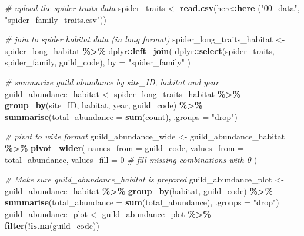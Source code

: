 \documentclass[
]{article}
\newenvironment{Shaded}{\begin{snugshade}}{\end{snugshade}}
\newcommand{\AttributeTok}[1]{\textcolor[rgb]{0.13,0.29,0.53}{#1}}
\newcommand{\CommentTok}[1]{\textcolor[rgb]{0.56,0.35,0.01}{\textit{#1}}}
\newcommand{\DecValTok}[1]{\textcolor[rgb]{0.00,0.00,0.81}{#1}}
\newcommand{\FunctionTok}[1]{\textcolor[rgb]{0.13,0.29,0.53}{\textbf{#1}}}
\newcommand{\NormalTok}[1]{#1}
\newcommand{\OtherTok}[1]{\textcolor[rgb]{0.56,0.35,0.01}{#1}}
\newcommand{\SpecialCharTok}[1]{\textcolor[rgb]{0.81,0.36,0.00}{\textbf{#1}}}
\newcommand{\StringTok}[1]{\textcolor[rgb]{0.31,0.60,0.02}{#1}}
\begin{document}
\begin{Shaded}
\begin{Highlighting}[]
\CommentTok{\# upload the spider traits data}
\NormalTok{spider\_traits }\OtherTok{\textless{}{-}} \FunctionTok{read.csv}\NormalTok{(here}\SpecialCharTok{::}\FunctionTok{here}\NormalTok{ (}\StringTok{"00\_data"}\NormalTok{, }\StringTok{"spider\_family\_traits.csv"}\NormalTok{))}

\CommentTok{\# join to spider habitat data (in long format)}
\NormalTok{spider\_long\_traits\_habitat }\OtherTok{\textless{}{-}}\NormalTok{ spider\_long\_habitat }\SpecialCharTok{\%\textgreater{}\%}
\NormalTok{  dplyr}\SpecialCharTok{::}\FunctionTok{left\_join}\NormalTok{(}
\NormalTok{    dplyr}\SpecialCharTok{::}\FunctionTok{select}\NormalTok{(spider\_traits, spider\_family, guild\_code),}
    \AttributeTok{by =} \StringTok{"spider\_family"}
\NormalTok{  )}

\CommentTok{\# summarize guild abundance by site\_ID, habitat and year}
\NormalTok{guild\_abundance\_habitat }\OtherTok{\textless{}{-}}\NormalTok{ spider\_long\_traits\_habitat }\SpecialCharTok{\%\textgreater{}\%}
  \FunctionTok{group\_by}\NormalTok{(site\_ID, habitat, year, guild\_code) }\SpecialCharTok{\%\textgreater{}\%}
  \FunctionTok{summarise}\NormalTok{(}\AttributeTok{total\_abundance =} \FunctionTok{sum}\NormalTok{(count), }\AttributeTok{.groups =} \StringTok{"drop"}\NormalTok{)}

\CommentTok{\# pivot to wide format}
\NormalTok{guild\_abundance\_wide }\OtherTok{\textless{}{-}}\NormalTok{ guild\_abundance\_habitat }\SpecialCharTok{\%\textgreater{}\%}
  \FunctionTok{pivot\_wider}\NormalTok{(}
    \AttributeTok{names\_from =}\NormalTok{ guild\_code,}
    \AttributeTok{values\_from =}\NormalTok{ total\_abundance,}
    \AttributeTok{values\_fill =} \DecValTok{0}  \CommentTok{\# fill missing combinations with 0}
\NormalTok{  )}

\CommentTok{\# Make sure guild\_abundance\_habitat is prepared}
\NormalTok{guild\_abundance\_plot }\OtherTok{\textless{}{-}}\NormalTok{ guild\_abundance\_habitat }\SpecialCharTok{\%\textgreater{}\%}
  \FunctionTok{group\_by}\NormalTok{(habitat, guild\_code) }\SpecialCharTok{\%\textgreater{}\%}
  \FunctionTok{summarise}\NormalTok{(}\AttributeTok{total\_abundance =} \FunctionTok{sum}\NormalTok{(total\_abundance), }\AttributeTok{.groups =} \StringTok{"drop"}\NormalTok{)}
\NormalTok{guild\_abundance\_plot }\OtherTok{\textless{}{-}}\NormalTok{ guild\_abundance\_plot }\SpecialCharTok{\%\textgreater{}\%}
  \FunctionTok{filter}\NormalTok{(}\SpecialCharTok{!}\FunctionTok{is.na}\NormalTok{(guild\_code))}



\end{Highlighting}
\end{Shaded}
\end{document}
